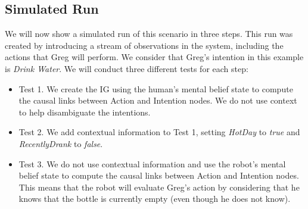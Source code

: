 \subsection{Simulated Run}
We will now show a simulated run of this scenario in three steps. This run was created by introducing a stream of observations in the system, including the actions that Greg will perform. We consider that Greg's intention in this example is \textit{Drink Water}. We will conduct three different tests for each step:
\begin{itemize}
	\item Test 1. We create the IG using the human's mental belief state to compute the causal links between Action and Intention nodes. We do not use context to help disambiguate the intentions.
	\item Test 2. We add contextual information to Test 1, setting \textit{HotDay} to \textit{true} and \textit{RecentlyDrank} to \textit{false}.
	\item Test 3. We do not use contextual information and use the robot's mental belief state to compute the causal links between Action and Intention nodes. This means that the robot will evaluate Greg's action by considering that he knows that the bottle is currently empty (even though he does not know).
\end{itemize}

